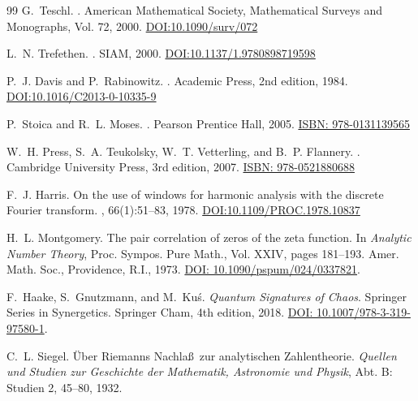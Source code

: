 \documentclass{article}
\numberwithin{equation}{section}
\theoremstyle{plain}
\theoremstyle{definition}
\theoremstyle{remark}
\begin{document}
\begin{thebibliography}{99}
G.~Teschl.
.
\newblock American Mathematical Society, Mathematical Surveys and Monographs, Vol. 72, 2000.
\href{https://doi.org/10.1090/surv/072}{DOI:10.1090/surv/072}

L.~N. Trefethen.
.
\newblock SIAM, 2000.
\href{https://doi.org/10.1137/1.9780898719598}{DOI:10.1137/1.9780898719598}

P.~J. Davis and P.~Rabinowitz.
.
\newblock Academic Press, 2nd edition, 1984.
\href{https://doi.org/10.1016/C2013-0-10335-9}{DOI:10.1016/C2013-0-10335-9}

P.~Stoica and R.~L. Moses.
.
\newblock Pearson Prentice Hall, 2005.
\href{http://www.mps.aau.dk/digitalAssets/128/128965_spectral-analysis-of-signals.pdf}{ISBN: 978-0131139565}

W.~H. Press, S.~A. Teukolsky, W.~T. Vetterling, and B.~P. Flannery.
.
\newblock Cambridge University Press, 3rd edition, 2007.
\href{http://numerical.recipes/}{ISBN: 978-0521880688}

F.~J. Harris.
\newblock On the use of windows for harmonic analysis with the discrete Fourier transform.
, 66(1):51--83, 1978.
\href{https://doi.org/10.1109/PROC.1978.10837}{DOI:10.1109/PROC.1978.10837}

H.~L. Montgomery.
\newblock The pair correlation of zeros of the zeta function.
\newblock In \emph{Analytic Number Theory}, Proc. Sympos. Pure Math., Vol. XXIV, pages 181--193. Amer. Math. Soc., Providence, R.I., 1973.
\newblock \href{https://doi.org/10.1090/pspum/024/0337821}{DOI: 10.1090/pspum/024/0337821}.

F.~Haake, S.~Gnutzmann, and M.~Ku\'s.
\newblock \emph{Quantum Signatures of Chaos}.
\newblock Springer Series in Synergetics. Springer Cham, 4th edition, 2018.
\newblock \href{https://doi.org/10.1007/978-3-319-97580-1}{DOI: 10.1007/978-3-319-97580-1}.


C.~L. Siegel.
\newblock \"Uber Riemanns Nachla\ss\ zur analytischen Zahlentheorie.
\newblock \emph{Quellen und Studien zur Geschichte der Mathematik, Astronomie und Physik}, Abt. B: Studien 2, 45--80, 1932.

\end{thebibliography}
\end{document}
